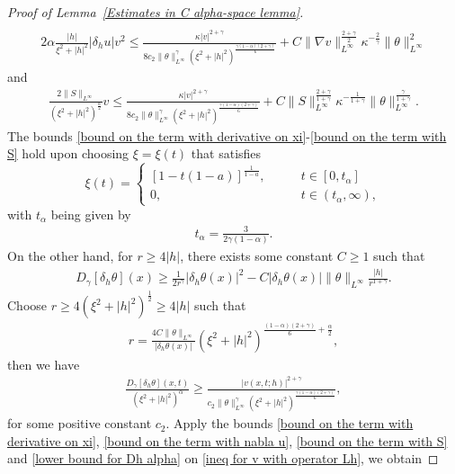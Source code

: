 \documentclass[reqno]{amsart}%
\theoremstyle{definition}
\theoremstyle{remark}
\numberwithin{equation}{section}
\newcommand{\Dh}{\delta_{h}}
\newcommand{\1}{\mathbf{1}}
\numberwithin{equation}{section}
\numberwithin{theorem}{section}
\numberwithin{figure}{section}
\begin{document}
\begin{proof}[Proof of Lemma~\ref{Estimates in C alpha-space lemma}]
\begin{align}
\end{align}
\begin{align}\label{bound on the term with nabla u}
2\alpha\frac{|h|}{\xi^2+|h|^2}|\Dh u|v^2\le \frac{\kappa|v|^{2+\gamma}}{8c_2\|\theta\|^\gamma_{L^\infty}(\xi^2+|h|^2)^\frac{\gamma(1-\alpha)(2+\gamma)}{6}}+C\|\nabla v\|^\frac{2+\gamma}{2}_{L^\infty}\kappa^{-\frac{2}{\gamma}}\|\theta\|^2_{L^\infty}
\end{align}
and
\begin{align}\label{bound on the term with S}
\frac{2\|S\|_{L^\infty}}{(\xi^2+|h|^2)^\frac{\alpha}{2}}v\le\frac{\kappa|v|^{2+\gamma}}{8c_2\|\theta\|^\gamma_{L^\infty}(\xi^2+|h|^2)^\frac{\gamma(1-\alpha)(2+\gamma)}{6}}+C\|S\|^\frac{2+\gamma}{1+\gamma}_{L^\infty}\kappa^{-\frac{1}{1+\gamma}}\|\theta\|^{\frac{\gamma}{1+\gamma}}_{L^\infty}.
\end{align}
The bounds \eqref{bound on the term with derivative on xi}-\eqref{bound on the term with S} hold upon choosing $\xi=\xi(t)$ that satisfies
\begin{equation} \label{def of xi 2}
			\xi(t)=\begin{cases}
				[1-t(1-a)]^\frac{1}{1-a},\qquad &t\in[0,t_{\alpha}] \\ 
				0,\qquad &t\in(t_{\alpha},\infty),
			\end{cases}
\end{equation}
with $t_{\alpha}$ being given by
\begin{align}\label{def of t alpha}
t_{\alpha}=\frac{3}{2\gamma(1-\alpha)}.
\end{align}
On the other hand, for $r\ge4|h|$, there exists some constant $C\ge1$ such that
\begin{align*}
D_{\gamma}[\Dh\theta](x)\ge\frac{1}{2r^\gamma}|\Dh\theta(x)|^2-C|\Dh\theta(x)|\|\theta\|_{L^\infty}\frac{|h|}{r^{1+\gamma}}.
\end{align*}
Choose $r\ge4(\xi^2+|h|^2)^\frac{1}{2}\ge 4|h|$ such that
\begin{align*}
r=\frac{4C\|\theta\|_{L^\infty}}{|\Dh\theta(x)|}(\xi^2+|h|^2)^{\frac{(1-\alpha)(2+\gamma)}{6}+\frac{\alpha}{2}},
\end{align*}
then we have
\begin{align}\label{lower bound for Dh alpha}
\frac{D_{\gamma}[\Dh\theta](x,t)}{(\xi^2+|h|^2)^\alpha}\ge\frac{|v(x,t;h)|^{2+\gamma}}{c_2\|\theta\|^\gamma_{L^\infty}(\xi^2+|h|^2)^\frac{\gamma(1-\alpha)(2+\gamma)}{6}},
\end{align}
for some positive constant $c_2$. Apply the bounds \eqref{bound on the term with derivative on xi}, \eqref{bound on the term with nabla u}, \eqref{bound on the term with S} and  \eqref{lower bound for Dh alpha} on \eqref{ineq for v with operator Lh}, we obtain

\end{proof}
\end{document}
